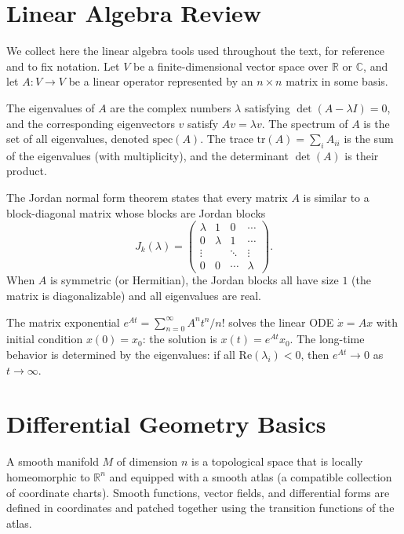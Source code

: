 \documentclass[11pt, twoside, openright]{book}
\theoremstyle{dotted}
\theoremstyle{definition}
\begin{document}
\section{Linear Algebra Review}

We collect here the linear algebra tools used throughout the text, for reference
and to fix notation. Let $V$ be a finite-dimensional vector space over $\mathbb{R}$
or $\mathbb{C}$, and let $A: V \to V$ be a linear operator represented by an
$n \times n$ matrix in some basis.

The eigenvalues of $A$ are the complex numbers $\lambda$ satisfying
$\det(A - \lambda I) = 0$, and the corresponding eigenvectors $v$ satisfy
$Av = \lambda v$. The spectrum of $A$ is the set of all eigenvalues, denoted
$\mathrm{spec}(A)$. The trace $\mathrm{tr}(A) = \sum_i A_{ii}$ is the sum of the
eigenvalues (with multiplicity), and the determinant $\det(A)$ is their product.

The Jordan normal form theorem states that every matrix $A$ is similar to a
block-diagonal matrix whose blocks are Jordan blocks
\begin{equation}
  J_k(\lambda) = \begin{pmatrix}
    \lambda & 1 & 0 & \cdots \\
    0 & \lambda & 1 & \cdots \\
    \vdots & & \ddots & \vdots \\
    0 & 0 & \cdots & \lambda
  \end{pmatrix}.
  \label{eq:jordan_block}
\end{equation}
When $A$ is symmetric (or Hermitian), the Jordan blocks all have size $1$
(the matrix is diagonalizable) and all eigenvalues are real.

The matrix exponential $e^{At} = \sum_{n=0}^\infty A^n t^n/n!$ solves the
linear ODE $\dot x = Ax$ with initial condition $x(0) = x_0$: the solution is
$x(t) = e^{At}x_0$. The long-time behavior is determined by the eigenvalues:
if all $\mathrm{Re}(\lambda_i) < 0$, then $e^{At} \to 0$ as $t \to \infty$.

\section{Differential Geometry Basics}

A smooth manifold $M$ of dimension $n$ is a topological space that is locally
homeomorphic to $\mathbb{R}^n$ and equipped with a smooth atlas (a compatible
collection of coordinate charts). Smooth functions, vector fields, and differential
forms are defined in coordinates and patched together using the transition functions
of the atlas.
\end{document}
